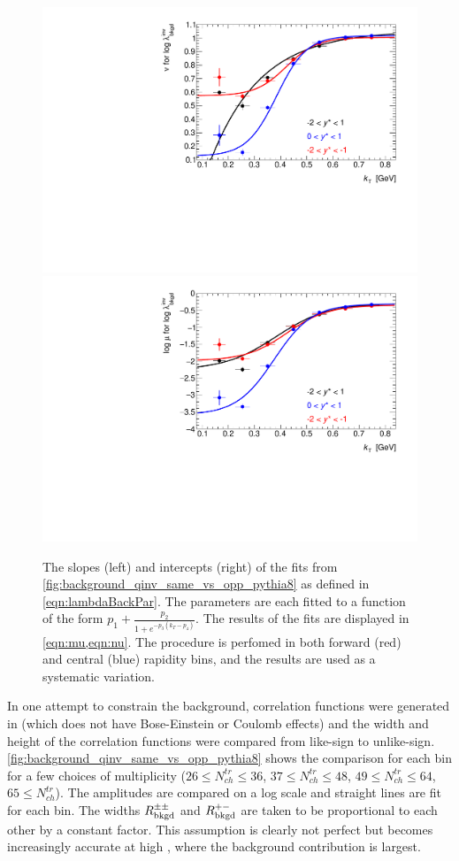 \begin{figure}[t]
\begin{minipage}[t]{1.0\textwidth}
\centering
\includegraphics[width=.49\linewidth]{can_kt_qinv_backLambda_slope_combined.pdf}
\includegraphics[width=.49\linewidth]{can_kt_qinv_backLambda_intercept_combined.pdf}
\end{minipage}
\caption{The slopes (left) and intercepts (right) of the fits from \cref{fig:background_qinv_same_vs_opp_pythia8} as defined in \cref{eqn:lambdaBackPar}. The parameters are each fitted to a function of the form $p_1 + \frac{p_2}{1 + e^{-p_3(k_T - p_4)}}$. The results of the fits are displayed in \cref{eqn:mu,eqn:nu}. The procedure is perfomed in both forward (red) and central (blue) rapidity bins, and the results are used as a systematic variation.}
\label{fig:background_qinv_same_vs_opp_pythia8_fits}
\end{figure}

In one attempt to constrain the background, correlation functions were generated in  (which does not have Bose-Einstein or Coulomb effects) and the width and height of the correlation functions were compared from like-sign to unlike-sign.
\cref{fig:background_qinv_same_vs_opp_pythia8} shows the comparison for each \kt bin for a few choices of multiplicity ($26 \leq N_{ch}^{tr} \leq36$, $37 \leq N_{ch}^{tr} \leq48$, $49 \leq N_{ch}^{tr} \leq64$, $65 \leq N_{ch}^{tr}$).
The amplitudes are compared on a log scale and straight lines are fit for each \kt bin.
The widths $R_{\mathrm{bkgd}}^{\pm\pm}$ and $R_{\mathrm{bkgd}}^{+-}$ are taken to be proportional to each other by a constant factor.
This assumption is clearly not perfect but becomes increasingly accurate at high \kt, where the background contribution is largest.

